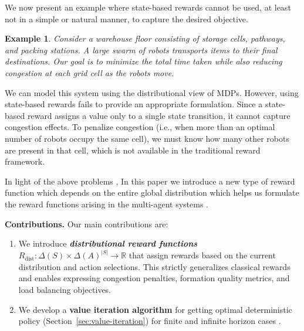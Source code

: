 \documentclass{article}
\newcommand{\ak}[1]{\textcolor{red}{ak: #1}}
\newtheorem*{example*}{Example}
\begin{document}
We now present an example where state-based rewards cannot be used, at least not in a simple or natural manner, to capture the desired objective. 

\begin{example*} \label{example1}
    Consider a warehouse floor consisting of storage cells, pathways, and packing stations. A large swarm of robots transports items to their final destinations. Our goal is to minimize the total time taken while also reducing congestion at each grid cell as the robots move.
\end{example*}
 We can model this system using the distributional view of MDPs. However, using state-based rewards fails to provide an appropriate formulation. Since a state-based reward assigns a value only to a single state transition, it cannot capture congestion effects. To penalize congestion (i.e., when more than an optimal number of robots occupy the same cell), we must know how many other robots are present in that cell, which is not available in the traditional reward framework. 

In light of the above problems , In this paper we introduce a new type of reward function which depends on the entire global distribution which helps us formulate the reward functions arising in the multi-agent systems .

\textbf{Contributions.} 
Our main contributions are:\begin{enumerate}

    \item We introduce  \textbf{ \emph{distributional reward functions} } $R_{\text{dist}}: \Delta(S) \times \Delta(A)^{|S|} \to \mathbb{R}$ that assign rewards based on the current distribution and action selections. This strictly generalizes classical rewards 
    and enables expressing congestion penalties, formation quality metrics, and load balancing objectives. 

    
    \item  We develop a \textbf{ value iteration algorithm } for getting optimal  deterministic policy (Section~\ref{sec:value-iteration}) for finite and infinite horizon cases .
    
 
\end{enumerate}
\end{document}
